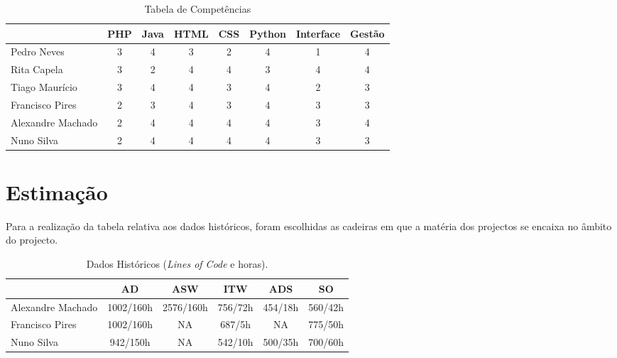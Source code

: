 \documentclass[12pt, a4paper, twoside]{report} %
\begin{document}
\begin{table}[h]
\centering
\begin{tabular}{|l|c c c c c c c|}
\hline
                  & PHP & Java & HTML & CSS & Python & Interface & Gestão \\ \hline
Pedro Neves       & 3   & 4    & 3    & 2   & 4      & 1         & 4      \\ \hline
Rita Capela       & 3   & 2    & 4    & 4   & 3      & 4         & 4      \\ \hline
Tiago Maurício    & 3   & 4    & 4    & 3   & 4      & 2         & 3      \\ \hline
Francisco Pires   & 2   & 3    & 4    & 3   & 4      & 3         & 3      \\ \hline
Alexandre Machado & 2   & 4    & 4    & 4   & 4      & 3         & 4      \\ \hline
Nuno Silva        & 2   & 4    & 4    & 4   & 4      & 3         & 3      \\ \hline
\end{tabular}
\caption{Tabela de Competências}
\label{competencias}
\end{table}

\clearpage


\section{Estimação}

Para a realização da tabela relativa aos dados históricos, foram escolhidas as cadeiras em que a matéria dos projectos se encaixa no âmbito do projecto.

\begin{table}[h]
\centering
\begin{tabular}{|l|c c c c c|}
\hline
                  & AD        & ASW       & ITW     & ADS     & SO      \\ \hline
Alexandre Machado & 1002/160h & 2576/160h & 756/72h & 454/18h & 560/42h \\ \hline
Francisco Pires   & 1002/160h & NA        & 687/5h  & NA      & 775/50h \\ \hline
Nuno Silva        & 942/150h  & NA        & 542/10h & 500/35h & 700/60h\\ \hline
\end{tabular}
\caption{ Dados Históricos (\textit{Lines of Code} e horas).}
\label{my-label}
\end{table}
\end{document}
